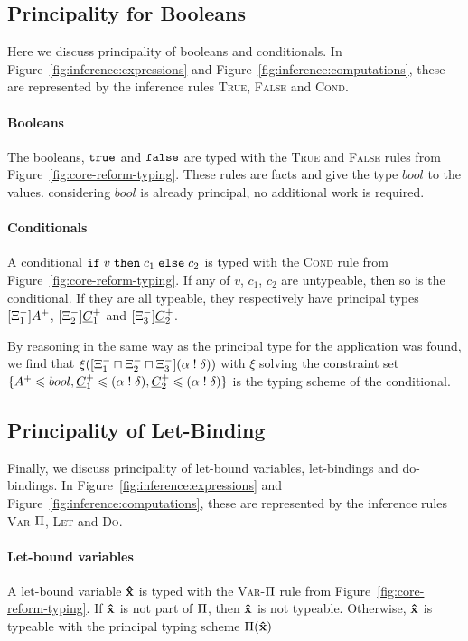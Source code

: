 \subsection{Principality for Booleans}
Here we discuss principality of booleans and conditionals. In Figure~\ref{fig:inference:expressions} and Figure~\ref{fig:inference:computations}, these are represented by the inference rules \textsc{True}, \textsc{False} and \textsc{Cond}.

\paragraph{Booleans} The booleans, $\mathtt{true}$ and $\mathtt{false}$ are typed with the \textsc{True} and \textsc{False} rules from Figure~\ref{fig:core-reform-typing}. These rules are facts and give the type $bool$ to the values. considering $bool$ is already principal, no additional work is required.

\paragraph{Conditionals} A conditional $\mathtt{if}\; v \;\mathtt{then}\; c_1 \;\mathtt{else}\; c_2$ is typed with the \textsc{Cond} rule from Figure~\ref{fig:core-reform-typing}. If any of $v$, $c_1$, $c_2$ are untypeable, then so is the conditional. If they are all typeable, they respectively have principal types $[\Xi^-_1]A^+$, $[\Xi^-_2]\underline{C}^+_1$ and $[\Xi^-_3]\underline{C}^+_2$.

By reasoning in the same way as the principal type for the application was found, we find that $\xi([\Xi^-_1 \sqcap \Xi^-_2 \sqcap \Xi^-_3](\alpha \mathrel{!} \delta))$ with $\xi$ solving the constraint set $\{A^+ \leqslant bool, \underline{C}^+_1 \leqslant (\alpha \mathrel{!} \delta), \underline{C}^+_2 \leqslant (\alpha \mathrel{!} \delta)\}$ is the typing scheme of the conditional.

\subsection{Principality of Let-Binding}
Finally, we discuss principality of let-bound variables, let-bindings and do-bindings. In Figure~\ref{fig:inference:expressions} and Figure~\ref{fig:inference:computations}, these are represented by the inference rules \textsc{Var-$\Pi$}, \textsc{Let} and \textsc{Do}.

\paragraph{Let-bound variables} A let-bound variable $\textbf{\^{x}}$ is typed with the \textsc{Var-$\Pi$} rule from Figure~\ref{fig:core-reform-typing}. If $\textbf{\^{x}}$ is not part of $\Pi$, then $\textbf{\^{x}}$ is not typeable. Otherwise, $\textbf{\^{x}}$ is typeable with the principal typing scheme $\Pi(\textbf{\^{x}})$

